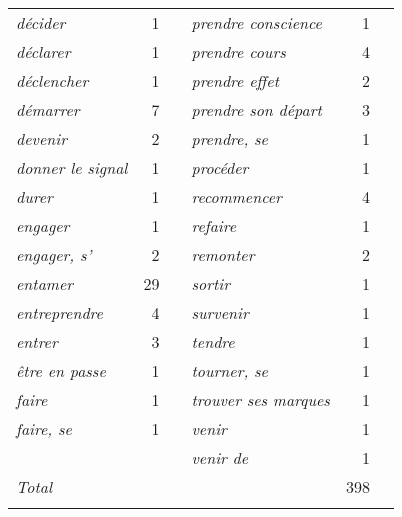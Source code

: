 \begin{table}
\begin{tabularx}{\textwidth}{>{\itshape}lrX>{\itshape}lrr}
décider &  1                              & & prendre conscience &  1\\
déclarer &  1                             & & prendre cours &  4\\
déclencher &  1                           & & prendre effet &  2\\
démarrer &  7                             & & prendre son départ &  3\\
devenir &  2                              & & prendre, se &  1\\
donner le signal &  1                     & & procéder &  1\\
durer &  1                                & & recommencer &  4\\
engager &  1                              & & refaire &  1\\
engager, s' &  2                          & & remonter &  2\\
entamer &  29                             & & sortir &  1\\
entreprendre &  4                         & & survenir &  1\\
entrer &  3                               & & tendre &  1\\
être en passe &  1                        & & tourner, se &  1\\
faire &  1                                & & trouver ses marques &  1\\
faire, se &  1                            & & venir &  1\\
          &                               & & venir de &  1\\                                 
\midrule 
\normalfont Total & & & & 398\\
\lspbottomrule
\end{tabularx}
\end{table}


